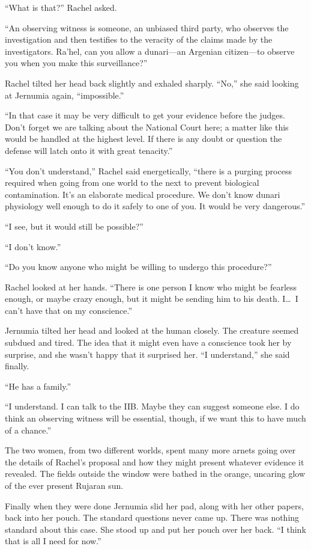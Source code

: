 ``What is that?'' Rachel asked.

``An observing witness is someone, an unbiased third party, who observes the investigation and
then testifies to the veracity of the claims made by the investigators. Ra'hel, can you allow a
dunari---an Argenian citizen---to observe you when you make this surveillance?''

Rachel tilted her head back slightly and exhaled sharply. ``No,'' she said looking at Jernumia
again, ``impossible.''

``In that case it may be very difficult to get your evidence before the judges. Don't forget we
are talking about the National Court here; a matter like this would be handled at the highest
level. If there is any doubt or question the defense will latch onto it with great tenacity.''

``You don't understand,'' Rachel said energetically, ``there is a purging process required when
going from one world to the next to prevent biological contamination. It's an elaborate medical
procedure. We don't know dunari physiology well enough to do it safely to one of you. It would
be very dangerous.''

``I see, but it would still be possible?''

``I don't know.''

``Do you know anyone who might be willing to undergo this procedure?''

Rachel looked at her hands. ``There is one person I know who might be fearless enough, or maybe
crazy enough, but it might be sending him to his death. I\ldots\ I can't have that on my
conscience.''

Jernumia tilted her head and looked at the human closely. The creature seemed subdued and tired.
The idea that it might even have a conscience took her by surprise, and she wasn't happy that it
surprised her. ``I understand,'' she said finally.

``He has a family.''

``I understand. I can talk to the IIB. Maybe they can suggest someone else. I do think an
observing witness will be essential, though, if we want this to have much of a chance.''

The two women, from two different worlds, spent many more arnets going over the details of
Rachel's proposal and how they might present whatever evidence it revealed. The fields outside
the window were bathed in the orange, uncaring glow of the ever present Rujaran sun.

Finally when they were done Jernumia slid her pad, along with her other papers, back into her
pouch. The standard questions never came up. There was nothing standard about this case. She
stood up and put her pouch over her back. ``I think that is all I need for now.''

